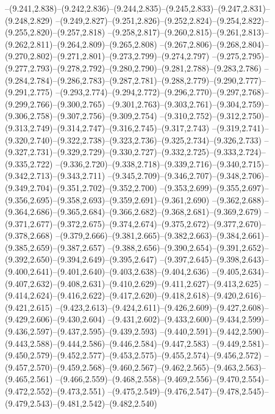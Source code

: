   --(9.241,2.838)--(9.242,2.836)--(9.244,2.835)--(9.245,2.833)--(9.247,2.831)--(9.248,2.829)%
  --(9.249,2.827)--(9.251,2.826)--(9.252,2.824)--(9.254,2.822)--(9.255,2.820)--(9.257,2.818)%
  --(9.258,2.817)--(9.260,2.815)--(9.261,2.813)--(9.262,2.811)--(9.264,2.809)--(9.265,2.808)%
  --(9.267,2.806)--(9.268,2.804)--(9.270,2.802)--(9.271,2.801)--(9.273,2.799)--(9.274,2.797)%
  --(9.275,2.795)--(9.277,2.793)--(9.278,2.792)--(9.280,2.790)--(9.281,2.788)--(9.283,2.786)%
  --(9.284,2.784)--(9.286,2.783)--(9.287,2.781)--(9.288,2.779)--(9.290,2.777)--(9.291,2.775)%
  --(9.293,2.774)--(9.294,2.772)--(9.296,2.770)--(9.297,2.768)--(9.299,2.766)--(9.300,2.765)%
  --(9.301,2.763)--(9.303,2.761)--(9.304,2.759)--(9.306,2.758)--(9.307,2.756)--(9.309,2.754)%
  --(9.310,2.752)--(9.312,2.750)--(9.313,2.749)--(9.314,2.747)--(9.316,2.745)--(9.317,2.743)%
  --(9.319,2.741)--(9.320,2.740)--(9.322,2.738)--(9.323,2.736)--(9.325,2.734)--(9.326,2.733)%
  --(9.327,2.731)--(9.329,2.729)--(9.330,2.727)--(9.332,2.725)--(9.333,2.724)--(9.335,2.722)%
  --(9.336,2.720)--(9.338,2.718)--(9.339,2.716)--(9.340,2.715)--(9.342,2.713)--(9.343,2.711)%
  --(9.345,2.709)--(9.346,2.707)--(9.348,2.706)--(9.349,2.704)--(9.351,2.702)--(9.352,2.700)%
  --(9.353,2.699)--(9.355,2.697)--(9.356,2.695)--(9.358,2.693)--(9.359,2.691)--(9.361,2.690)%
  --(9.362,2.688)--(9.364,2.686)--(9.365,2.684)--(9.366,2.682)--(9.368,2.681)--(9.369,2.679)%
  --(9.371,2.677)--(9.372,2.675)--(9.374,2.674)--(9.375,2.672)--(9.377,2.670)--(9.378,2.668)%
  --(9.379,2.666)--(9.381,2.665)--(9.382,2.663)--(9.384,2.661)--(9.385,2.659)--(9.387,2.657)%
  --(9.388,2.656)--(9.390,2.654)--(9.391,2.652)--(9.392,2.650)--(9.394,2.649)--(9.395,2.647)%
  --(9.397,2.645)--(9.398,2.643)--(9.400,2.641)--(9.401,2.640)--(9.403,2.638)--(9.404,2.636)%
  --(9.405,2.634)--(9.407,2.632)--(9.408,2.631)--(9.410,2.629)--(9.411,2.627)--(9.413,2.625)%
  --(9.414,2.624)--(9.416,2.622)--(9.417,2.620)--(9.418,2.618)--(9.420,2.616)--(9.421,2.615)%
  --(9.423,2.613)--(9.424,2.611)--(9.426,2.609)--(9.427,2.608)--(9.429,2.606)--(9.430,2.604)%
  --(9.431,2.602)--(9.433,2.600)--(9.434,2.599)--(9.436,2.597)--(9.437,2.595)--(9.439,2.593)%
  --(9.440,2.591)--(9.442,2.590)--(9.443,2.588)--(9.444,2.586)--(9.446,2.584)--(9.447,2.583)%
  --(9.449,2.581)--(9.450,2.579)--(9.452,2.577)--(9.453,2.575)--(9.455,2.574)--(9.456,2.572)%
  --(9.457,2.570)--(9.459,2.568)--(9.460,2.567)--(9.462,2.565)--(9.463,2.563)--(9.465,2.561)%
  --(9.466,2.559)--(9.468,2.558)--(9.469,2.556)--(9.470,2.554)--(9.472,2.552)--(9.473,2.551)%
  --(9.475,2.549)--(9.476,2.547)--(9.478,2.545)--(9.479,2.543)--(9.481,2.542)--(9.482,2.540)%
